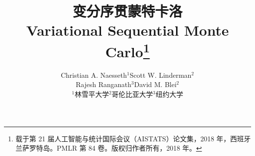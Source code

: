 \title{\sffamily\bfseries\color{paperblue}变分序贯蒙特卡洛\\[0.4em]\large Variational Sequential Monte Carlo\thanks{载于第 21 届人工智能与统计国际会议（AISTATS）论文集，2018 年，西班牙兰萨罗特岛。PMLR 第 84 卷。版权归作者所有，2018 年。}}
\author{Christian A. Naesseth$^1$\quad Scott W. Linderman$^2$\\Rajesh Ranganath$^3$\quad David M. Blei$^2$\\[0.4em]\small $^1$林雪平大学\quad $^2$哥伦比亚大学\quad $^3$纽约大学}
\date{}
